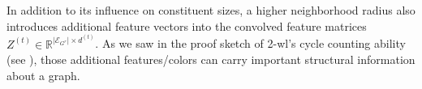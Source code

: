 In addition to its influence on constituent sizes, a higher neighborhood radius also introduces additional feature vectors into the convolved feature matrices $Z^{(t)} \in \mathbb{R}^{\left|\mathcal{E}_{G^r}\right| \times d^{(t)}}$.
As we saw in the proof sketch of 2-\acs{wl}'s cycle counting ability (see ), those additional features/colors can carry important structural information about a graph.
